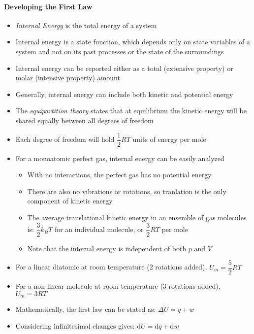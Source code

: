 \documentclass[12pt, openany, letterpaper]{memoir}
\begin{document}
\paragraph{Developing the First Law}
\begin{itemize}
	\item \emph{Internal Energy} is the total energy of a system
	\item Internal energy is a state function, which depends only on state variables of a system and not on its past processes or the state of the surroundings
	\item Internal energy can be reported either as a total (extensive property) or molar (intensive property) amount
	\item Generally, internal energy can include both kinetic and potential energy
	\item The \emph{equipartition theory} states that at equilibrium the kinetic energy will be shared equally between all degrees of freedom
	\item Each degree of freedom will hold $\dfrac{1}{2}RT$ units of energy per mole
	\item For a monoatomic perfect gas, internal energy can be easily analyzed
	      \begin{itemize}
		      \item With no interactions, the perfect gas has no potential energy
		      \item There are also no vibrations or rotations, so tranlation is the only component of kinetic energy
		      \item The average translational kinetic energy in an ensemble of gas molecules is: $\dfrac{3}{2}k_BT$ for an individual molecule, or $\dfrac{3}{2}RT$ per mole
		      \item Note that the internal energy is independent of both $p$ and $V$
	      \end{itemize}
	\item For a linear diatomic at room temperature (2 rotations added), $U_m = \dfrac{5}{2}RT$
	\item For a non-linear molecule at room temperature (3 rotations added), $U_m = 3RT$
	\item Mathematically, the first law can be stated as: $\Delta U = q + w$
	\item Considering infinitesimal changes gives: $\mathrm{d}U = \mathrm{d}q + \mathrm{d}w$
\end{itemize}
\end{document}
